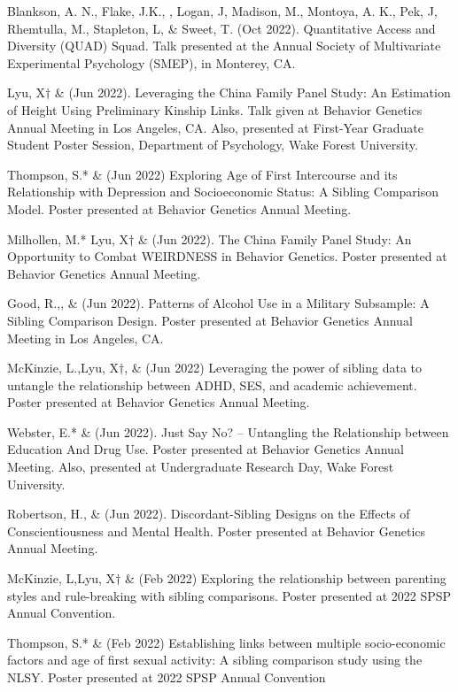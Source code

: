 \begin{etaremune}
\item  Blankson, A. N., Flake, J.K., \meb, Logan, J, Madison, M., Montoya, A. K., Pek, J, Rhemtulla, M., Stapleton, L, \& Sweet, T. (Oct 2022). Quantitative Access and Diversity (QUAD) Squad. Talk presented at the Annual Society of Multivariate Experimental Psychology (SMEP), in Monterey, CA.

\item Lyu, X$\dagger$ \& \meb (Jun 2022). Leveraging the China Family Panel Study: An Estimation of Height Using Preliminary Kinship Links. Talk given at Behavior Genetics Annual Meeting in Los Angeles, CA. Also, presented at First-Year Graduate Student Poster Session, Department of Psychology, Wake Forest University.
%
\item Thompson, S.* \& \meb (Jun 2022) Exploring Age of First Intercourse and its Relationship with Depression and Socioeconomic Status: A Sibling Comparison Model.  Poster presented at Behavior Genetics Annual Meeting.
\item Milhollen, M.* Lyu, X$\dagger$ \&  \meb (Jun 2022). The China Family Panel Study: An Opportunity to Combat WEIRDNESS in Behavior Genetics. Poster presented at Behavior Genetics Annual Meeting.
\item Good, R.,\noteA \yrh, \&  \meb (Jun 2022). Patterns of Alcohol Use in a Military Subsample: A Sibling Comparison Design.  Poster presented at Behavior Genetics Annual Meeting in Los Angeles, CA.
%
\item McKinzie, L.,\noteA Lyu, X$\dagger$, \& \meb (Jun 2022) Leveraging the power of sibling data to untangle the relationship between ADHD, SES, and academic achievement. Poster presented at Behavior Genetics Annual Meeting.
%
\item Webster, E.* \& \meb (Jun 2022). Just Say No? – Untangling the Relationship between Education And Drug Use. Poster presented at Behavior Genetics Annual Meeting. Also, presented at Undergraduate Research Day, Wake Forest University.
%
\item Robertson, H.\noteA \jdt, \Joe \&  \meb (Jun 2022). Discordant-Sibling Designs on the Effects of Conscientiousness and Mental Health. Poster presented at Behavior Genetics Annual Meeting.
%
\item McKinzie, L,\noteA Lyu, X$\dagger$ \& \meb (Feb 2022) Exploring the relationship between parenting styles and rule-breaking with sibling comparisons. Poster presented at 2022 SPSP Annual Convention.
%
\item Thompson, S.* \& \meb (Feb 2022) Establishing links between multiple socio-economic factors and age of first sexual activity: A sibling comparison study using the NLSY. Poster presented at 2022 SPSP Annual Convention

\end{etaremune}
